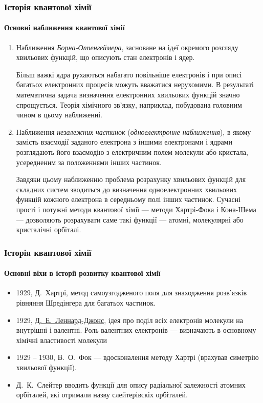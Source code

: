 \documentclass[10pt]{beamer}
\begin{document}
\begin{frame}
	\frametitle{Історія квантової хімії}
	\framesubtitle{Основні наближення квантової хімії}
	\begin{enumerate}
		\item Наближення \emph{Борна-Оппенгеймера}, засноване на ідеї окремого розгляду хвильових функцій, що описують стан електронів і ядер.

		      \medskip
		      {\footnotesize  Більш важкі ядра рухаються набагато повільніше електронів і при описі багатьох електронних процесів можуть вважатися нерухомими. В результаті математична задача визначення електронних хвильових функцій значно спрощується. Теорія хімічного зв'язку, наприклад, побудована головним чином в цьому наближенні.}

		      \bigskip
		\item Наближення\emph{ незалежних частинок} (\emph{одноелектронне наближення}), в якому замість взаємодії заданого електрона з іншими електронами і ядрами розглядають його взаємодію з електричним полем молекули або кристала, усередненим за положеннями інших частинок.

		      \medskip
		      {\footnotesize Завдяки цьому наближенню проблема розрахунку хвильових функцій для складних систем зводиться до визначення одноелектронних хвильових функцій кожного електрона в середньому полі інших частинок. Сучасні прості і потужні методи квантової хімії --- методи Хартрі-Фока і Кона-Шема --- дозволяють розрахувати саме такі функції --- атомні, молекулярні або кристалічні орбіталі.}
	\end{enumerate}

\end{frame}


\begin{frame}
	\frametitle{Історія квантової хімії}
	\framesubtitle{Основні віхи в історії розвитку квантової хімії}
	\begin{itemize}
		\item 1929, Д.~Хартрі, метод самоузгодженого поля для знаходження розв'язків
		      рівняння Шредінгера для багатьох частинок.
		\item 1929,  \href{https://en.wikipedia.org/wiki/John_Lennard-Jones}{Д.~Е.~Леннард-Джонс}, ідея про поділ всіх електронів молекули на внутрішні і валентні. Роль валентних електронів --- визначають в основному хімічні властивості молекули
		\item 1929 -- 1930, В.~О.~Фок --- вдосконалення методу Хартрі (врахував симетрію хвильової функції).
		\item Д.~К.~Слейтер вводить функції для опису радіальної залежності атомних орбіталей, які отримали назву слейтерівскіх орбіталей.

	\end{itemize}
\end{frame}
\end{document}
